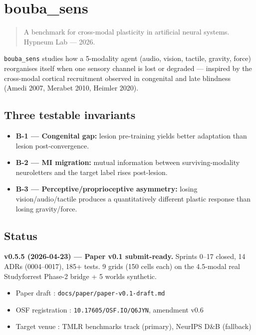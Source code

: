 \documentclass[
]{article}
\author{}
\date{}
\providecommand{\tightlist}{%
  \setlength{\itemsep}{0pt}\setlength{\parskip}{0pt}}
\begin{document}
\section{bouba\_sens}\label{bouba_sens}

\begin{quote}
A benchmark for cross-modal plasticity in artificial neural systems.
Hypneum Lab --- 2026.
\end{quote}

\texttt{bouba\_sens} studies how a 5-modality agent (audio, vision,
tactile, gravity, force) reorganises itself when one sensory channel is
lost or degraded --- inspired by the cross-modal cortical recruitment
observed in congenital and late blindness (Amedi 2007, Merabet 2010,
Heimler 2020).

\subsection{Three testable invariants}\label{three-testable-invariants}

\begin{itemize}
\tightlist
\item
  \textbf{B-1 --- Congenital gap:} lesion pre-training yields better
  adaptation than lesion post-convergence.
\item
  \textbf{B-2 --- MI migration:} mutual information between
  surviving-modality neuroletters and the target label rises
  post-lesion.
\item
  \textbf{B-3 --- Perceptive/proprioceptive asymmetry:} losing
  vision/audio/tactile produces a quantitatively different plastic
  response than losing gravity/force.
\end{itemize}

\subsection{Status}\label{status}

\textbf{v0.5.5 (2026-04-23) --- Paper v0.1 submit-ready.} Sprints 0--17
closed, 14 ADRs (0004--0017), 185+ tests. 9 grids (150 cells each) on
the 4.5-modal real Studyforrest Phase-2 bridge + 5 worlds synthetic.

\begin{itemize}
\tightlist
\item
  Paper draft : \texttt{docs/paper/paper-v0.1-draft.md}
\item
  OSF registration : \texttt{10.17605/OSF.IO/Q6JYN}, amendment v0.6
\item
  Target venue : TMLR benchmarks track (primary), NeurIPS D\&B
  (fallback)
\end{itemize}
\end{document}
